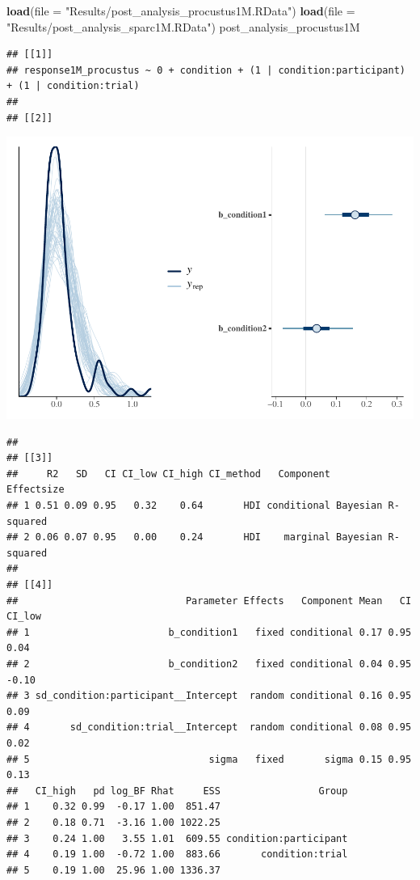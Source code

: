 \documentclass[
]{article}
\newenvironment{Shaded}{\begin{snugshade}}{\end{snugshade}}
\newcommand{\AttributeTok}[1]{\textcolor[rgb]{0.13,0.29,0.53}{#1}}
\newcommand{\FunctionTok}[1]{\textcolor[rgb]{0.13,0.29,0.53}{\textbf{#1}}}
\newcommand{\NormalTok}[1]{#1}
\newcommand{\StringTok}[1]{\textcolor[rgb]{0.31,0.60,0.02}{#1}}
\begin{document}
\begin{Shaded}
\begin{Highlighting}[]
\FunctionTok{load}\NormalTok{(}\AttributeTok{file =} \StringTok{"Results/post\_analysis\_procustus1M.RData"}\NormalTok{)}
\FunctionTok{load}\NormalTok{(}\AttributeTok{file =} \StringTok{"Results/post\_analysis\_sparc1M.RData"}\NormalTok{)}
\NormalTok{post\_analysis\_procustus1M}
\end{Highlighting}
\end{Shaded}

\begin{verbatim}
## [[1]]
## response1M_procustus ~ 0 + condition + (1 | condition:participant) + (1 | condition:trial) 
## 
## [[2]]
\end{verbatim}

\includegraphics{08_Publish_GUSO_ASIL_files/figure-latex/Diagnostiics1M-1.pdf}

\begin{verbatim}
## 
## [[3]]
##     R2   SD   CI CI_low CI_high CI_method   Component         Effectsize
## 1 0.51 0.09 0.95   0.32    0.64       HDI conditional Bayesian R-squared
## 2 0.06 0.07 0.95   0.00    0.24       HDI    marginal Bayesian R-squared
## 
## [[4]]
##                             Parameter Effects   Component Mean   CI CI_low
## 1                        b_condition1   fixed conditional 0.17 0.95   0.04
## 2                        b_condition2   fixed conditional 0.04 0.95  -0.10
## 3 sd_condition:participant__Intercept  random conditional 0.16 0.95   0.09
## 4       sd_condition:trial__Intercept  random conditional 0.08 0.95   0.02
## 5                               sigma   fixed       sigma 0.15 0.95   0.13
##   CI_high   pd log_BF Rhat     ESS                 Group
## 1    0.32 0.99  -0.17 1.00  851.47                      
## 2    0.18 0.71  -3.16 1.00 1022.25                      
## 3    0.24 1.00   3.55 1.01  609.55 condition:participant
## 4    0.19 1.00  -0.72 1.00  883.66       condition:trial
## 5    0.19 1.00  25.96 1.00 1336.37
\end{verbatim}
\end{document}

